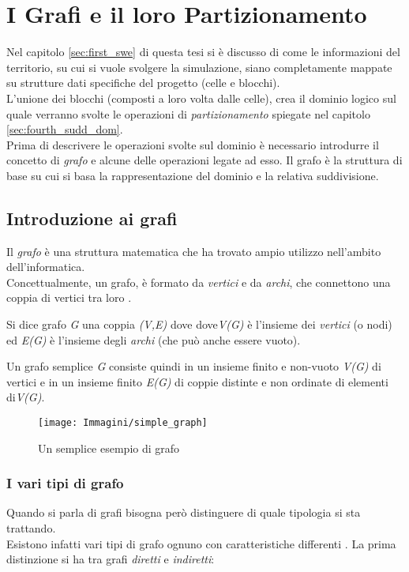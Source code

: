 \section{I Grafi e il loro Partizionamento}
Nel capitolo \ref{sec:first_swe} di questa tesi si è discusso di come le informazioni del territorio, su cui si vuole svolgere la simulazione, siano completamente mappate su strutture dati specifiche del progetto (celle e blocchi).\\
L'unione dei blocchi (composti a loro volta dalle celle), crea il dominio logico sul quale verranno svolte le operazioni di \emph{partizionamento} spiegate nel capitolo \ref{sec:fourth_sudd_dom}.\\
Prima di descrivere le operazioni svolte sul dominio è necessario introdurre il concetto di \emph{grafo} e alcune delle operazioni legate ad esso. Il grafo è la struttura di base su cui si basa la rappresentazione del dominio e la relativa suddivisione.

\subsection{Introduzione ai grafi}
Il \emph{grafo} è una struttura matematica che ha trovato ampio utilizzo nell'ambito dell'informatica.\\
Concettualmente, un grafo, è formato da \emph{vertici} e da \emph{archi}, che connettono una coppia di vertici tra loro \cite{cormen}.
\begin{defn}
Si dice grafo \emph{G} una coppia \emph{(V,E)} dove dove\emph{V(G)} è l'insieme dei \emph{vertici} (o nodi) ed \emph{E(G)} è l'insieme degli \emph{archi} (che può anche essere vuoto).
\end{defn}
Un grafo semplice \emph{G} consiste quindi in un insieme finito e non-vuoto \textit{V(G)} di vertici e in un insieme finito \textit{E(G)} di coppie distinte e non ordinate di elementi di\textit{V(G)}.
\begin{figure}[H]
	\centering
	\texttt{[image: Immagini/simple\_graph]}
	\caption{Un semplice esempio di grafo}
	\label{fig:simple_graph}
\end{figure}

\subsubsection{I vari tipi di grafo}\label{subsubsec:graph_type}
Quando si parla di grafi bisogna però distinguere di quale tipologia si sta trattando.\\
Esistono infatti vari tipi di grafo ognuno con caratteristiche differenti \cite{graph_theory}. La prima distinzione si ha tra grafi \emph{diretti} e \emph{indiretti}:

